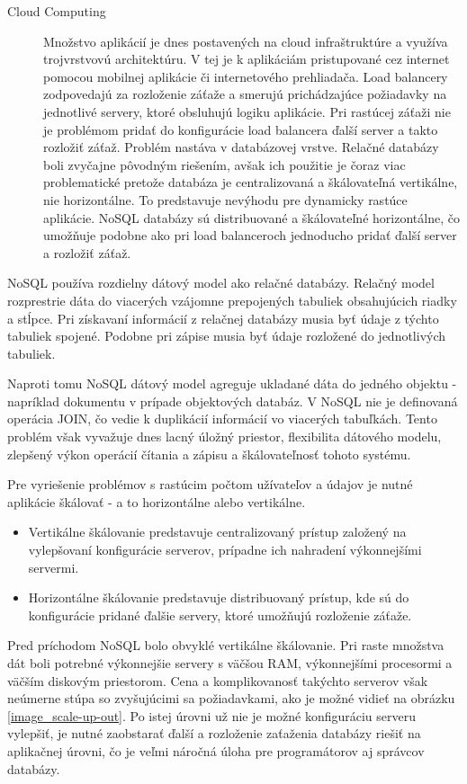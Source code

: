 \begin{description}
		\item[Cloud Computing] Množstvo aplikácií je dnes postavených na cloud infraštruktúre a využíva trojvrstvovú architektúru. V tej je k aplikáciám pristupované cez internet pomocou mobilnej aplikácie či internetového prehliadača. Load balancery zodpovedajú za rozloženie záťaže a smerujú prichádzajúce požiadavky na jednotlivé servery, ktoré obsluhujú logiku aplikácie. Pri rastúcej záťaži nie je problémom pridať do konfigurácie load balancera ďalší server a takto rozložiť záťaž.
		Problém nastáva v databázovej vrstve. Relačné databázy boli zvyčajne pôvodným riešením, avšak ich použitie je čoraz viac problematické pretože databáza je centralizovaná a škálovateľná vertikálne, nie horizontálne. To predstavuje nevýhodu pre dynamicky rastúce aplikácie. NoSQL databázy sú distribuované a škálovateľné horizontálne, čo umožňuje podobne ako pri load balanceroch jednoducho pridať ďalší server a rozložiť záťaž.
	\end{description}
	
	NoSQL používa rozdielny dátový model ako relačné databázy. Relačný model rozprestrie dáta do viacerých vzájomne prepojených tabuliek obsahujúcich riadky a stĺpce. Pri získavaní informácií z relačnej databázy musia byť údaje z týchto tabuliek spojené. Podobne pri zápise musia byť údaje rozložené do jednotlivých tabuliek.

	Naproti tomu NoSQL dátový model agreguje ukladané dáta do jedného objektu - napríklad dokumentu v prípade objektových databáz. V NoSQL nie je definovaná operácia JOIN, čo vedie k duplikácií informácií vo viacerých tabuľkách. Tento problém však vyvažuje dnes lacný úložný priestor, flexibilita dátového modelu, zlepšený výkon operácií čítania a zápisu a škálovateľnosť tohoto systému.
	
	
	Pre vyriešenie problémov s rastúcim počtom užívateľov a údajov je nutné aplikácie škálovať - a to horizontálne alebo vertikálne.
	\begin{itemize}
		\item Vertikálne škálovanie predstavuje centralizovaný prístup založený na vylepšovaní konfigurácie serverov, prípadne ich nahradení výkonnejšími servermi.
		\item Horizontálne škálovanie predstavuje distribuovaný prístup, kde sú do konfigurácie pridané ďalšie servery, ktoré umožňujú rozloženie záťaže.
	\end{itemize}
	Pred príchodom NoSQL bolo obvyklé vertikálne škálovanie. Pri raste množstva dát boli potrebné výkonnejšie servery s väčšou RAM, výkonnejšími procesormi a väčším diskovým priestorom. Cena a komplikovanosť takýchto serverov však neúmerne stúpa so zvyšujúcimi sa požiadavkami, ako je možné vidieť na obrázku \ref{image_scale-up-out}. Po istej úrovni už nie je možné konfiguráciu serveru vylepšiť, je nutné zaobstarať ďalší a rozloženie zaťaženia databázy riešiť na aplikačnej úrovni, čo je veľmi náročná úloha pre programátorov aj správcov databázy. 
	

